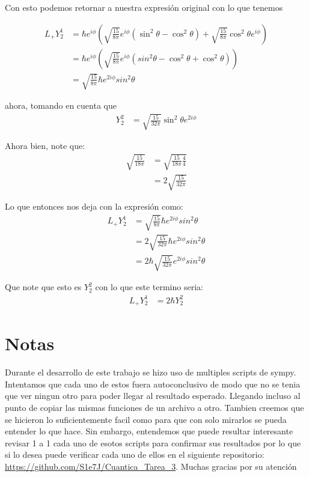 \documentclass{report}
\begin{document}
Con esto podemos retornar a nuestra expresión original con lo que tenemos

\begin{align*}
	L_+ Y_2^1 &= \hbar e^{i\phi} \left( \sqrt{\frac{15}{8\pi}}e^{i\phi}\left( \sin^2\theta - \cos^2\theta \right) +\sqrt{\frac{15}{8\pi}} \cos^2\theta e^{i\phi}  \right)\\
	&= \hbar e^{i\phi} \left( \sqrt{\frac{15}{8\pi}}e^{i\phi} \left( sin^2\theta - \cos^2\theta + \cos^2\theta \right) \right)\\
	&= \sqrt{\frac{15}{8\pi}}\hbar e^{2i\phi}  sin^2\theta
\end{align*}

ahora, tomando en cuenta que
\begin{align*}
	Y_2^2 &= \sqrt{\frac{15}{32\pi}}\sin^2\theta e^{2i\phi}
\end{align*}

Ahora bien, note que:
\begin{align*}
	\sqrt{\frac{15}{18\pi}} &= \sqrt{\frac{15}{18\pi} \frac{4}{4}}\\
	&= 2 \sqrt{\frac{15}{32\pi}}
\end{align*}

Lo que entonces nos deja con la expresión como:
\begin{align*}
	L_+ Y_2^1 &= \sqrt{\frac{15}{8\pi}}\hbar e^{2i\phi}  sin^2\theta\\
	&= 2 \sqrt{\frac{15}{32\pi}}\hbar e^{2i\phi}  sin^2\theta\\
	&= 2\hbar \sqrt{\frac{15}{32\pi}}e^{2i\phi}  sin^2\theta
\end{align*}

Que note que esto es $Y_2^2$ con lo que este termino seria:
\begin{align*}
	L_+ Y_2^1 &= 2\hbar Y_2^2
\end{align*}

\chapter{Notas}

Durante el desarrollo de este trabajo se hizo uso de multiples scripts de sympy. Intentamos que cada uno de estos fuera autoconclusivo de modo que no se tenia que ver ningun otro para poder llegar al resultado esperado. Llegando incluso al punto de copiar las mismas funciones de un archivo a otro. Tambien creemos que se hicieron lo suficientemente facil como para que con solo mirarlos se pueda entender lo que hace. Sin embargo, entendemos que puede resultar interesante revisar 1 a 1 cada uno de esotos scripts para confirmar sus resultados por lo que si lo desea puede verificar cada uno de ellos en el siguiente repositorio: \url{https://github.com/S1e7J/Cuantica_Tarea_3}. Muchas gracias por su atención
\end{document}
